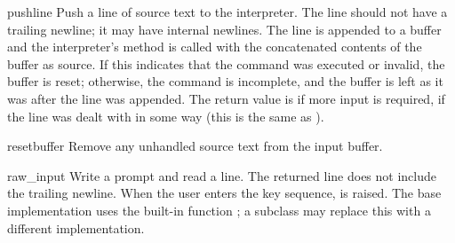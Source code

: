 \begin{methoddesc}{push}{line}
Push a line of source text to the interpreter.
The line should not have a trailing newline; it may have internal
newlines.  The line is appended to a buffer and the interpreter's
 method is called with the concatenated contents
of the buffer as source.  If this indicates that the command was
executed or invalid, the buffer is reset; otherwise, the command is
incomplete, and the buffer is left as it was after the line was
appended.  The return value is  if more input is required,
 if the line was dealt with in some way (this is the same as
).
\end{methoddesc}

\begin{methoddesc}{resetbuffer}{}
Remove any unhandled source text from the input buffer.
\end{methoddesc}

\begin{methoddesc}{raw_input}{}
Write a prompt and read a line.  The returned line does not include
the trailing newline.  When the user enters the \EOF{} key sequence,
 is raised.  The base implementation uses the
built-in function ; a subclass may replace this
with a different implementation.
\end{methoddesc}
